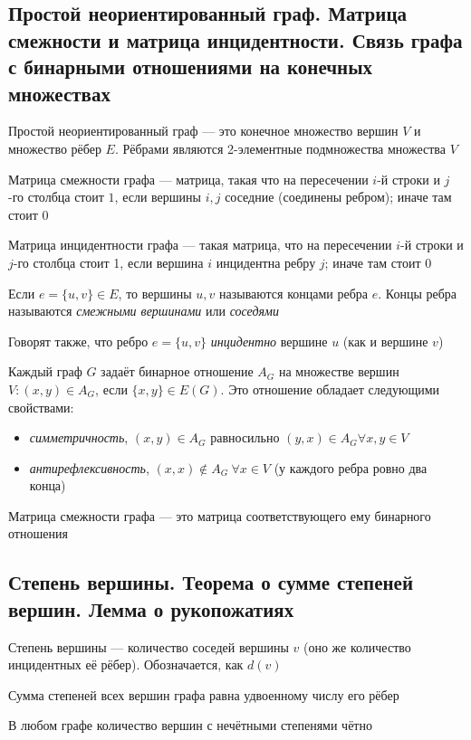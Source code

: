 \documentclass[a4paper]{article}
\begin{document}
\subsection{Простой неориентированный граф. Матрица смежности и матрица инцидентности. Связь графа с бинарными отношениями на конечных множествах}
 Простой неориентированный граф — это конечное множество вершин $V$ и множество рёбер $E$. Рёбрами являются 2-элементные подмножества множества $V$

 Матрица смежности графа — матрица, такая что на пересечении $i$-й строки и $j$-го столбца стоит $1$, если вершины $i, j$ соседние (соединены ребром); иначе там стоит 0

 Матрица инцидентности графа — такая матрица, что на пересечении $i$-й строки и $j$-го столбца стоит 1, если вершина $i$ инцидентна ребру $j$; иначе там стоит 0

Если $e=\{u, v\} \in E$, то вершины $u, v$ называются концами ребра $e$. Концы ребра называются \textit{смежными вершинами} или \textit{соседями}

Говорят также, что ребро $e=\{u, v\}$ \textit{инцидентно} вершине $u$ (как и вершине $v$)

\comment Каждый граф $G$ задаёт бинарное отношение $A_G$ на множестве вершин $V:(x, y) \in A_G$, если $\{x, y\} \in E(G)$. Это отношение обладает следующими свойствами:
\begin{itemize}
    \item \textit{симметричность}, $(x,y) \in A_G$ равносильно $(y,x) \in A_G \forall x,y \in V$
    \item \textit{антирефлексивность}, $(x, x) \notin A_G\ \forall x \in V$ (у каждого ребра ровно два конца)
\end{itemize}

 Матрица смежности графа — это матрица соответствующего ему бинарного отношения

\subsection{Степень вершины. Теорема о сумме степеней вершин. Лемма о рукопожатиях}
\label{sec:1.65} Степень вершины — количество соседей вершины $v$ (оно же количество инцидентных её рёбер). Обозначается, как $d(v)$

\theorem Сумма степеней всех вершин графа равна удвоенному числу его рёбер

\lemma В любом графе количество вершин с нечётными степенями чётно
\end{document}

